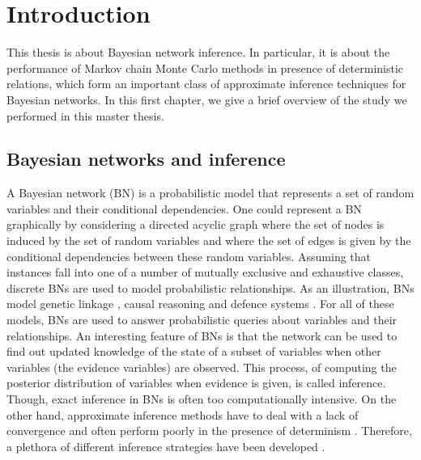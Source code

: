 \documentclass[a4paper, twoside, 11pt]{report}
\theoremstyle{plain}
\theoremstyle{definition}
\theoremstyle{remark}
\begin{document}

\tableofcontents

\clearpage


\restoregeometry



\chapter{Introduction}\label{intro}
This thesis is about Bayesian network inference. In particular, it is about the performance of Markov chain Monte Carlo methods in presence of deterministic relations, which form an important class of approximate inference techniques for Bayesian networks. In this first chapter, we give a brief overview of the study we performed in this master thesis.

\section{Bayesian networks and inference}
A Bayesian network (BN) is a probabilistic model that represents a set of random variables and their conditional dependencies. One could represent a BN graphically by considering a directed acyclic graph where the set of nodes is induced by the set of random variables and where the set of edges is given by the conditional dependencies between these random variables. Assuming that instances fall into one of a number of mutually exclusive and exhaustive classes, discrete BNs are used to model probabilistic relationships. As an illustration, BNs model genetic linkage \cite{fishelson2004}, causal reasoning \cite{pearl2014probabilistic} and defence systems \cite{phillipson2015modelling}. For all of these models, BNs are used to answer probabilistic queries about variables and their relationships. An interesting feature of BNs is that the network can be used to find out updated knowledge of the state of a subset of variables when other variables (the evidence variables) are observed. This process, of computing the posterior distribution of variables when evidence is given, is called inference. Though, exact inference in BNs is often too computationally intensive. On the other hand, approximate inference methods have to deal with a lack of convergence and often perform poorly in the presence of determinism \cite{koller2009probabilistic, poon2006sound, gogate2011samplesearch}. Therefore, a plethora of different inference strategies have been developed \cite{nasrabadi2007pattern, nielsen2009bayesian, koller2009probabilistic, pearl2014probabilistic}.
\end{document}
